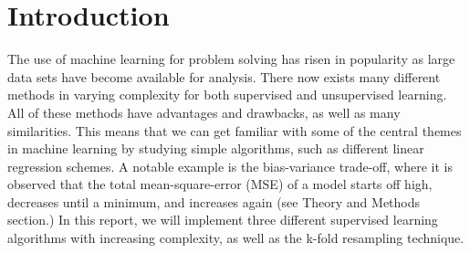 \section{Introduction}
\label{sec:introduction}

The use of machine learning for problem solving has risen in popularity as large data sets have become available for analysis. There now exists many different methods in varying complexity for both supervised and unsupervised learning. All of these methods have advantages and drawbacks, as well as many similarities. This means that we can get familiar with some of the central themes in machine learning by studying simple algorithms, such as different linear regression schemes. A notable example is the bias-variance trade-off, where it is observed that the total mean-square-error (MSE) of a model starts off high, decreases until a minimum, and increases again (see Theory and Methods section.)
In this report, we will implement three different supervised learning algorithms with increasing complexity, as well as the k-fold resampling technique.